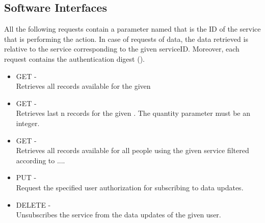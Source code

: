 \documentclass[../../../rasd.tex]{subfiles}
\begin{document}
\subsection{Software Interfaces}
			All the following requests contain a parameter named  that is the ID of the service that is performing the action. In case of requests of data, the data retrieved is relative to the service corresponding to the given serviceID.
			Moreover, each request contains the authentication digest ().
			\begin{itemize}
				\item GET -  \\
				Retrieves all records available for the given 
				\item GET -  \\
				Retrieves last n records for the given . The quantity parameter must be an integer.
				\item GET -  \\
				Retrieves all records available for all people using the given service filtered according to ....\\ 
				\item PUT -  \\
				Request the specified user authorization for subscribing to data updates.
				\item DELETE -  \\
				Unsubscribes the service from the data updates of the given user.
			\end{itemize}
\end{document}
